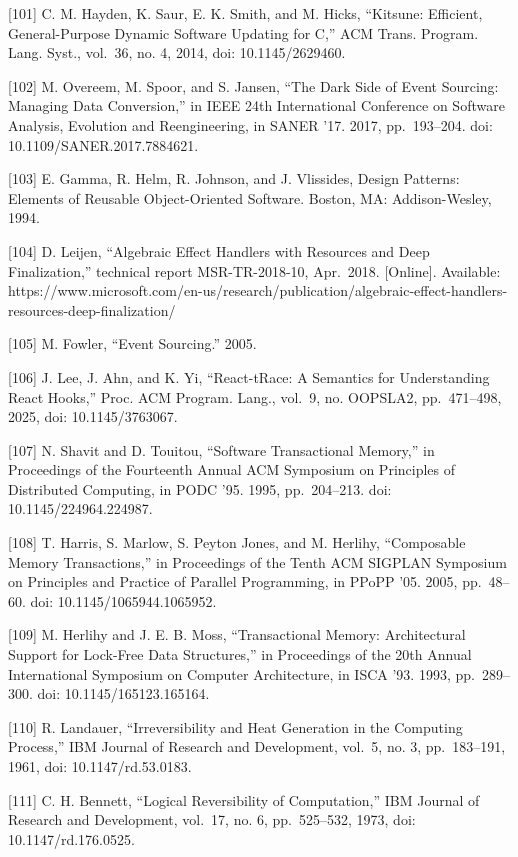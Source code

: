 \documentclass[
  10
]{article}
\begin{document}
{[}101{]} C. M. Hayden, K. Saur, E. K. Smith, and M. Hicks, ``Kitsune: Efficient,
General-Purpose Dynamic Software Updating for C,'' ACM Trans. Program. Lang. Syst.,
vol.~36, no. 4, 2014, doi: 10.1145/2629460.

{[}102{]} M. Overeem, M. Spoor, and S. Jansen, ``The Dark Side of Event Sourcing:
Managing Data Conversion,'' in IEEE 24th International Conference on Software
Analysis, Evolution and Reengineering, in SANER '17. 2017, pp.~193--204. doi:
10.1109/SANER.2017.7884621.

{[}103{]} E. Gamma, R. Helm, R. Johnson, and J. Vlissides, Design Patterns: Elements
of Reusable Object-Oriented Software. Boston, MA: Addison-Wesley, 1994.

{[}104{]} D. Leijen, ``Algebraic Effect Handlers with Resources and Deep
Finalization,'' technical report MSR-TR-2018-10, Apr.~2018. {[}Online{]}. Available:
https://www.microsoft.com/en-us/research/publication/algebraic-effect-handlers-resources-deep-finalization/

{[}105{]} M. Fowler, ``Event Sourcing.'' 2005.

{[}106{]} J. Lee, J. Ahn, and K. Yi, ``React-tRace: A Semantics for Understanding
React Hooks,'' Proc. ACM Program. Lang., vol.~9, no. OOPSLA2, pp.~471--498, 2025,
doi: 10.1145/3763067.

{[}107{]} N. Shavit and D. Touitou, ``Software Transactional Memory,'' in
Proceedings of the Fourteenth Annual ACM Symposium on Principles of Distributed
Computing, in PODC '95. 1995, pp.~204--213. doi: 10.1145/224964.224987.

{[}108{]} T. Harris, S. Marlow, S. Peyton Jones, and M. Herlihy, ``Composable Memory
Transactions,'' in Proceedings of the Tenth ACM SIGPLAN Symposium on Principles and
Practice of Parallel Programming, in PPoPP '05. 2005, pp.~48--60. doi:
10.1145/1065944.1065952.

{[}109{]} M. Herlihy and J. E. B. Moss, ``Transactional Memory: Architectural
Support for Lock-Free Data Structures,'' in Proceedings of the 20th Annual
International Symposium on Computer Architecture, in ISCA '93. 1993, pp.~289--300.
doi: 10.1145/165123.165164.

{[}110{]} R. Landauer, ``Irreversibility and Heat Generation in the Computing
Process,'' IBM Journal of Research and Development, vol.~5, no. 3, pp.~183--191,
1961, doi: 10.1147/rd.53.0183.

{[}111{]} C. H. Bennett, ``Logical Reversibility of Computation,'' IBM Journal of
Research and Development, vol.~17, no. 6, pp.~525--532, 1973, doi: 10.1147/rd.176.0525.
\end{document}
